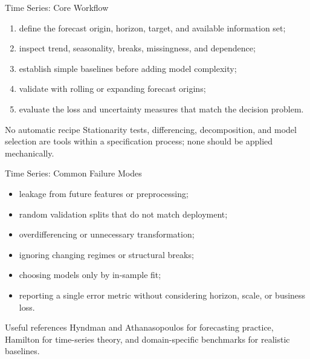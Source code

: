
\begin{frame}{Time Series: Core Workflow}
\begin{enumerate}
  \item define the forecast origin, horizon, target, and available information set;
  \item inspect trend, seasonality, breaks, missingness, and dependence;
  \item establish simple baselines before adding model complexity;
  \item validate with rolling or expanding forecast origins;
  \item evaluate the loss and uncertainty measures that match the decision problem.
\end{enumerate}

\begin{alertblock}{No automatic recipe}
Stationarity tests, differencing, decomposition, and model selection are tools within a specification process; none should be applied mechanically.
\end{alertblock}
\end{frame}

\begin{frame}{Time Series: Common Failure Modes}
\begin{itemize}
  \item leakage from future features or preprocessing;
  \item random validation splits that do not match deployment;
  \item overdifferencing or unnecessary transformation;
  \item ignoring changing regimes or structural breaks;
  \item choosing models only by in-sample fit;
  \item reporting a single error metric without considering horizon, scale, or business loss.
\end{itemize}

\begin{block}{Useful references}
Hyndman and Athanasopoulos for forecasting practice, Hamilton for time-series theory, and domain-specific benchmarks for realistic baselines.
\end{block}
\end{frame}

